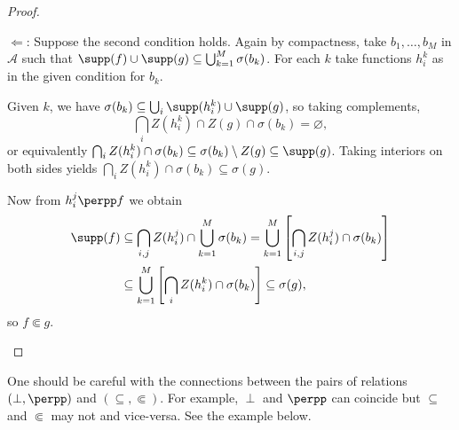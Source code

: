 \begin{proof}
\begin{enumerate}
$\Leftarrow$: Suppose the second condition holds. Again by compactness, take $b_1,\ldots,b_M$ in $\mathcal{A}$ such that $\supp(f)\cup\supp(g)\subseteq\bigcup_{k=1}^M\sigma(b_k)$. For each $k$ take functions $h_i^k$ as in the given condition for $b_k$.

Given $k$, we have $\sigma(b_k)\subseteq\bigcup_i\supp(h_i^k)\cup\supp(g)$, so taking complements,
\[\bigcap_iZ(h_i^k)\cap Z(g)\cap\sigma(b_k)=\varnothing,\]
or equivalently $\bigcap_iZ(h_i^k)\cap\sigma(b_k)\subseteq\sigma(b_k)\setminus Z(g)\subseteq\supp(g)$. Taking interiors on both sides yields $\bigcap_iZ(h_i^k)\cap\sigma(b_k)\subseteq\sigma(g)$.

Now from $h_i^j\perpp f$ we obtain
\begin{align*}
\supp(f)&\subseteq\bigcap_{i,j}Z(h_i^j)\cap\bigcup_{k=1}^M\sigma(b_k)=\bigcup_{k=1}^M\left[\bigcap_{i,j}Z(h_i^j)\cap\sigma(b_k)\right]\\
&\subseteq\bigcup_{k=1}^M\left[\bigcap_i Z(h_i^k)\cap\sigma(b_k)\right]\subseteq \sigma(g),
\end{align*}
so $f\Subset g$.\qedhere
\end{enumerate}
\end{proof}

\begin{remark}
One should be careful with the connections between the pairs of relations $(\perp,\perpp)$ and $(\subseteq,\Subset)$. For example, $\perp$ and $\perpp$ can coincide but $\subseteq$ and $\Subset$ may not and vice-versa. See the example below.
\end{remark}

